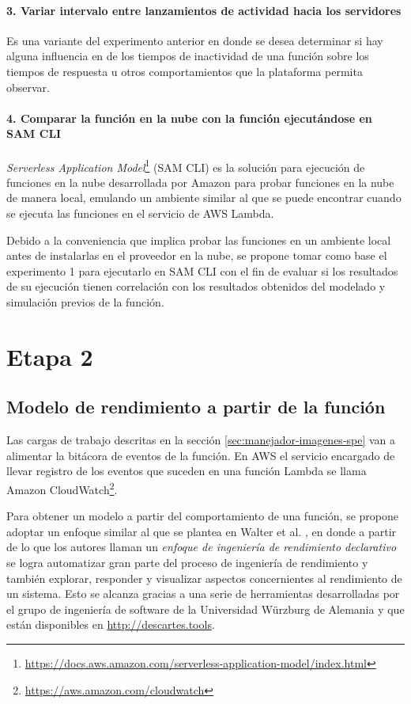 \paragraph{3. Variar intervalo entre lanzamientos de actividad hacia los servidores}
Es una variante del experimento anterior en donde se desea determinar si hay alguna influencia en de los tiempos de inactividad de una función sobre los tiempos de respuesta u otros comportamientos que la plataforma permita observar.


\paragraph{4. Comparar la función en la nube con la función ejecutándose en SAM CLI}

\emph{Serverless Application Model}\footnote{\url{https://docs.aws.amazon.com/serverless-application-model/index.html}} (SAM CLI) es la solución para ejecución de funciones en la nube desarrollada por Amazon para probar funciones en la nube de manera local, emulando un ambiente similar al que se puede encontrar cuando se ejecuta las funciones en el servicio de AWS Lambda.

Debido a la conveniencia que implica probar las funciones en un ambiente local antes de instalarlas en el proveedor en la nube, se propone tomar como base el experimento 1 para ejecutarlo en SAM CLI con el fin de evaluar si los resultados de su ejecución tienen correlación con los resultados obtenidos del modelado y simulación previos de la función.

\section{Etapa 2}

\subsection{Modelo de rendimiento a partir de la función}
Las cargas de trabajo descritas en la sección \ref{sec:manejador-imagenes-spe} van a alimentar la bitácora de eventos de la función. En AWS el servicio encargado de llevar registro de los eventos que suceden en una función Lambda se llama Amazon CloudWatch\footnote{\url{https://aws.amazon.com/cloudwatch}}. 

Para obtener un modelo a partir del comportamiento de una función, se propone adoptar un enfoque similar al que se plantea en Walter et al. \cite{Walter:2018:TDP:3185768.3185777}, en donde a partir de lo que los autores llaman un \emph{enfoque de ingeniería de rendimiento declarativo} se logra automatizar gran parte del proceso de ingeniería de rendimiento y también explorar, responder y visualizar aspectos concernientes al rendimiento de un sistema. Esto se alcanza gracias a una serie de herramientas desarrolladas por el grupo de ingeniería de software de la Universidad Würzburg de Alemania y que están disponibles en \url{http://descartes.tools}.

